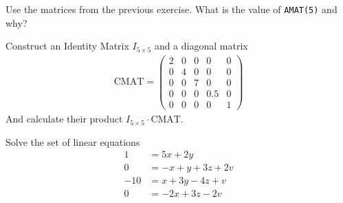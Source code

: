 \begin{ex}
Use the matrices from the previous exercise. What is the value of \verb!AMAT(5)! and why?
\end{ex}


\begin{ex}
Construct an Identity Matrix $I_{5\times5}$ and a diagonal matrix
\begin{align*}
\textrm{CMAT} = \begin{pmatrix}
2 &0 &0 &0 &0	\\
0 &4 &0 &0 &0	\\
0 &0 &7 &0 &0	\\
0 &0 &0 &0.5 &0	\\
0 &0 &0 &0 &1	
\end{pmatrix}
\end{align*}
And calculate their product $I_{5 \times 5} \cdot \textrm{CMAT}$.
\end{ex}


\begin{ex}
Solve the set of linear equations
\begin{align*}
1	& = 5x + 2y	\\
0	& = -x + y + 3z + 2v	\\
-10 	& = x + 3y - 4z + v	\\
0	& = -2x + 3z - 2v 
\end{align*}
\end{ex}
\known{$\backslash$}



